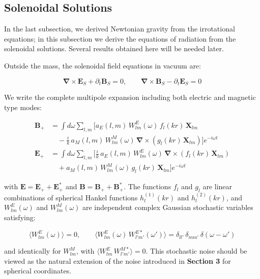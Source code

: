 \documentclass {article}
\renewcommand\vec{\mathbf}
\let\OldS\nabla
\renewcommand{\nabla}{\boldsymbol{\OldS}}
\begin{document}
\subsection{Solenoidal Solutions}


In the last subsection, we derived Newtonian gravity from the irrotational equations; in this subsection we derive the equations of radiation from the solenoidal solutions. Several results obtained here will be needed later.

Outside the mass, the solenoidal field equations in vacuum are:

\begin{equation}
\nabla \times \vec{E}_S + \partial_t \vec{B}_S = 0, \qquad
\nabla \times \vec{B}_S - \partial_t \vec{E}_S = 0
\end{equation}

We write the complete multipole expansion including both electric and magnetic type modes:

\begin{equation}
\begin{aligned}
\vec{B}_+ &= \int d\omega \sum_{l,m} \bigg[
a_E(l,m)\, W_{lm}^E(\omega)\, f_l(kr)\, \vec{X}_{lm} \\
&\quad  - \frac{i}{k}\, a_M(l,m)\, W_{lm}^M(\omega)\, \nabla \times \left( g_l(kr)\, \vec{X}_{lm} \right)
\bigg] e^{-i\omega t} \\
\vec{E}_+ &= \int d\omega \sum_{l,m} \bigg[
\frac{i}{k}\, a_E(l,m)\, W_{lm}^E(\omega)\, \nabla \times \left( f_l(kr)\, \vec{X}_{lm} \right) \\
&\quad  + a_M(l,m)\, W_{lm}^M(\omega)\, g_l(kr)\, \vec{X}_{lm}
\bigg] e^{-i\omega t}
\end{aligned}
\end{equation}

\noindent with $\vec{E} = \vec{E}_+ + \vec{E}_+^*$ and $\vec{B} = \vec{B}_+ + \vec{B}_+^*$. The functions $f_l$ and $g_l$ are linear combinations of spherical Hankel functions $h_l^{(1)}(kr)$ and $h_l^{(2)}(kr)$, and $W_{lm}^E(\omega)$ and $W_{lm}^M(\omega)$ are independent complex Gaussian stochastic variables satisfying:

\begin{equation}
\langle W_{lm}^E(\omega) \rangle = 0, \qquad
\langle W_{lm}^E(\omega)\, W_{l'm'}^{E*}(\omega') \rangle = \delta_{ll'}\, \delta_{mm'}\, \delta(\omega - \omega')
\end{equation}

\noindent and identically for $W_{lm}^M$, with $\langle W_{lm}^E\, W_{l'm'}^{M*} \rangle = 0$. This stochastic noise should be viewed as the natural extension of the noise introduced in \textbf{Section 3} for spherical coordinates.
\end{document}
